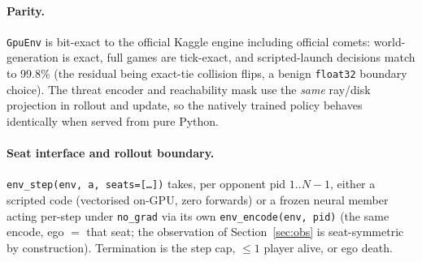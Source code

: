 \documentclass[11pt]{article}
\newcommand{\cd}[1]{\texttt{#1}}
\begin{document}
\paragraph{Parity.} \cd{GpuEnv} is bit-exact to the official Kaggle engine including official comets:
world-generation is exact, full games are tick-exact, and scripted-launch decisions match to
99.8\% (the residual being exact-tie collision flips, a benign \cd{float32} boundary choice). The
threat encoder and reachability mask use the \emph{same} ray/disk projection in rollout and update,
so the natively trained policy behaves identically when served from pure Python.

\paragraph{Seat interface and rollout boundary.} \cd{env\_step(env, a, seats=[\dots])} takes, per
opponent pid $1..N{-}1$, either a scripted code (vectorised on-GPU, zero forwards) or a frozen
neural member acting per-step under \cd{no\_grad} via its own \cd{env\_encode(env, pid)} (the same
encode, ego $=$ that seat; the observation of Section~\ref{sec:obs} is seat-symmetric by
construction). Termination is the step cap, $\le 1$ player alive, or ego death.

\end{document}
